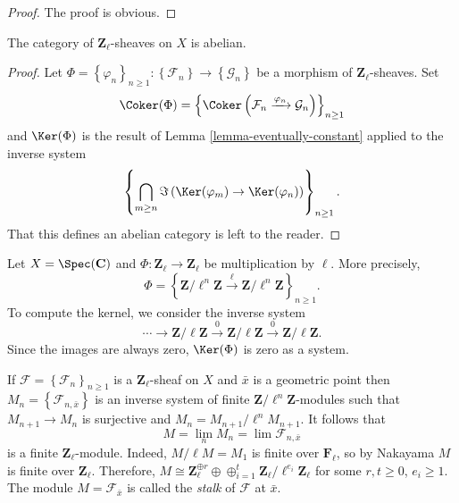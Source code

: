 \begin{proof}
The proof is obvious.
\end{proof}

\begin{lemma}
\label{lemma-l-adic-abelian}
The category of $\mathbf{Z}_\ell$-sheaves on $X$ is abelian.
\end{lemma}

\begin{proof}
Let $\Phi=\left\{\varphi_n\right\}_{n\geq 1}: \left\{\mathcal{F}_n\right\}\to
\left\{\mathcal{G}_n\right\}$ be a morphism of $\mathbf{Z}_\ell$-sheaves. Set
$$
\Coker(\Phi) =
\left\{
\Coker\left(\mathcal{F}_n \xrightarrow{\varphi_n} \mathcal{G}_n\right)
\right\}_{n\geq 1}
$$
and $\Ker(\Phi)$ is the result of
Lemma \ref{lemma-eventually-constant}
applied to the inverse system
$$
\left\{
\bigcap_{m\geq n}
\Im\left(\Ker(\varphi_m) \to \Ker(\varphi_n)\right)
\right\}_{n \geq 1}.
$$
That this defines an abelian category is left to the reader.
\end{proof}

\begin{example}
\label{example-kernel}
Let $X=\Spec(\mathbf{C})$ and $\Phi : \mathbf{Z}_\ell\to \mathbf{Z}_\ell$
be multiplication by $\ell$. More precisely,
$$
\Phi = \left\{ \mathbf{Z}/\ell^n\mathbf{Z} \xrightarrow{\ell}
\mathbf{Z}/\ell^n\mathbf{Z}\right\}_{n \geq 1}.
$$
To compute the kernel, we consider the inverse system
$$
\cdots\to \mathbf{Z}/\ell\mathbf{Z}\xrightarrow{0}
\mathbf{Z}/\ell\mathbf{Z}\xrightarrow{0}\mathbf{Z}/\ell\mathbf{Z}.
$$
Since the images are always zero, $\Ker(\Phi)$ is zero as a system.
\end{example}

\begin{remark}
\label{remark-stalk-l-adic-sheaf}
If $\mathcal{F} = \left\{\mathcal{F}_n\right\}_{n\geq 1}$ is a
$\mathbf{Z}_\ell$-sheaf on $X$ and $\bar x$ is a geometric point then
$M_n=\left\{\mathcal{F}_{n, \bar x}\right\}$ is an inverse system of finite
$\mathbf{Z}/\ell^n\mathbf{Z}$-modules such that $M_{n+1}\to M_n$ is surjective
and $M_n = M_{n+1}/\ell^n M_{n+1}$. It follows that
$$
M = \lim_n M_n = \lim \mathcal{F}_{n, \bar x}
$$
is a finite $\mathbf{Z}_\ell$-module. Indeed, $M/\ell M= M_1$ is finite over
$\mathbf{F}_\ell$, so by Nakayama $M$ is finite over $\mathbf{Z}_\ell$.
Therefore, $M\cong \mathbf{Z}_\ell^{\oplus r} \oplus \oplus_{i=1}^t
\mathbf{Z}_\ell/\ell^{e_i}\mathbf{Z}_\ell$ for some $r, t\geq 0$, $e_i\geq 1$.
The module $M = \mathcal{F}_{\bar x}$ is called the {\it stalk} of
$\mathcal{F}$ at $\bar x$.
\end{remark}

